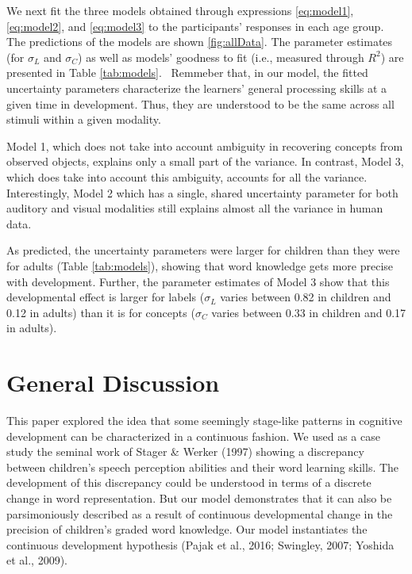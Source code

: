 \documentclass[english,,man]{apa6}
\begin{document}
We next fit the three models obtained through expressions \ref{eq:model1}, \ref{eq:model2}, and \ref{eq:model3} to the participants' responses in each age group. The predictions of the models are shown \ref{fig:allData}. The parameter estimates (for \(\sigma_L\) and \(\sigma_C\)) as well as models' goodness to fit (i.e., measured through \(R^2\)) are presented in Table \ref{tab:models}. ~Remmeber that, in our model, the fitted uncertainty parameters characterize the learners' general processing skills at a given time in development. Thus, they are understood to be the same across all stimuli within a given modality.

Model 1, which does not take into account ambiguity in recovering concepts from observed objects, explains only a small part of the variance. In contrast, Model 3, which does take into account this ambiguity, accounts for all the variance. Interestingly, Model 2 which has a single, shared uncertainty parameter for both auditory and visual modalities still explains almost all the variance in human data.

As predicted, the uncertainty parameters were larger for children than they were for adults (Table \ref{tab:models}), showing that word knowledge gets more precise with development. Further, the parameter estimates of Model 3 show that this developmental effect is larger for labels (\(\sigma_L\) varies between 0.82 in children and 0.12 in adults) than it is for concepts (\(\sigma_C\) varies between 0.33 in children and 0.17 in adults).

\hypertarget{general-discussion}{%
\section{General Discussion}\label{general-discussion}}

This paper explored the idea that some seemingly stage-like patterns in cognitive development can be characterized in a continuous fashion. We used as a case study the seminal work of Stager \& Werker (1997) showing a discrepancy between children's speech perception abilities and their word learning skills. The development of this discrepancy could be understood in terms of a discrete change in word representation. But our model demonstrates that it can also be parsimoniously described as a result of continuous developmental change in the precision of children's graded word knowledge. Our model instantiates the continuous development hypothesis (Pajak et al., 2016; Swingley, 2007; Yoshida et al., 2009).
\end{document}
